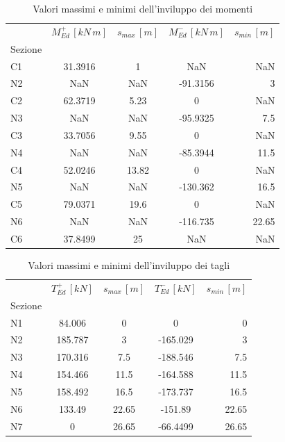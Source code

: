 \begin{table}
  	\centering
  	\caption{Valori massimi e minimi dell'inviluppo dei momenti}
  	\label{tab:max_min_bendingMomentEnvelope_sleFreq}
  	\begin{tabular}{lcccr}
		\toprule
		& $M_{Ed}^+\,[kN\,m]$ & $s_{max}\,[m]$ & $M_{Ed}^-\,[kN\,m]$ & $s_{min}\,[m]$ \\
		Sezione &             &          &             &          \\
\midrule
C1      &     31.3916 &        1 &         NaN &      NaN \\
N2      &         NaN &      NaN &    -91.3156 &        3 \\
C2      &     62.3719 &     5.23 &           0 &      NaN \\
N3      &         NaN &      NaN &    -95.9325 &      7.5 \\
C3      &     33.7056 &     9.55 &           0 &      NaN \\
N4      &         NaN &      NaN &    -85.3944 &     11.5 \\
C4      &     52.0246 &    13.82 &           0 &      NaN \\
N5      &         NaN &      NaN &    -130.362 &     16.5 \\
C5      &     79.0371 &     19.6 &           0 &      NaN \\
N6      &         NaN &      NaN &    -116.735 &    22.65 \\
C6      &     37.8499 &       25 &         NaN &      NaN \\
\bottomrule
	\end{tabular}
  \end{table}
  
\begin{table}
  	\centering
  	\caption{Valori massimi e minimi dell'inviluppo dei tagli}
  	\label{tab:shearEnvelope_sleFreq}
  	\begin{tabular}{lcccr}
		\toprule
		& $T_{Ed}^+\,[kN]$ & $s_{max}\,[m]$ & $T_{Ed}^-\,[kN]$ & $s_{min}\,[m]$ \\
		Sezione &             &          &             &          \\
		\midrule
N1      &    84.006 &        0 &         0 &        0 \\
N2      &   185.787 &        3 &  -165.029 &        3 \\
N3      &   170.316 &      7.5 &  -188.546 &      7.5 \\
N4      &   154.466 &     11.5 &  -164.588 &     11.5 \\
N5      &   158.492 &     16.5 &  -173.737 &     16.5 \\
N6      &    133.49 &    22.65 &   -151.89 &    22.65 \\
N7      &         0 &    26.65 &  -66.4499 &    26.65 \\
		\bottomrule
	\end{tabular}
  \end{table}


